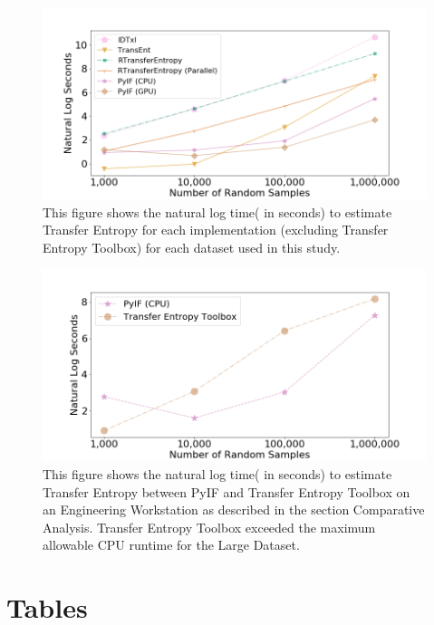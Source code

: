 \begin{figure}
  \centerline{\includegraphics[scale=0.8]{figures/PyIF/WallTime-TE.png}}
  \caption{This figure shows the natural log time( in seconds) to estimate Transfer Entropy for each implementation (excluding Transfer Entropy Toolbox) for each dataset used in this study. }
  \label{TE-walltime}
\end{figure}


\begin{figure}
  \centerline{\includegraphics[scale=0.8]{figures/PyIF/WallTime-TE2.png}}
  \caption{This figure shows the natural log time( in seconds) to estimate Transfer Entropy between PyIF and Transfer Entropy Toolbox on an Engineering Workstation as described in the section Comparative Analysis. Transfer Entropy Toolbox exceeded the maximum allowable CPU runtime for the Large Dataset. }
  \label{TE-walltime2}
\end{figure}

\clearpage
\section{Tables}

